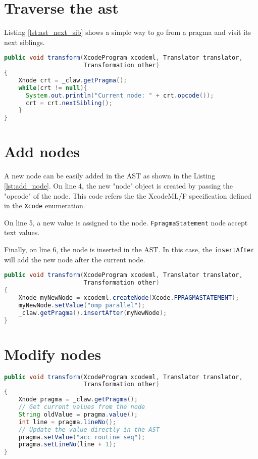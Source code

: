 \section{Traverse the \gls{ast}}
Listing \ref{lst:ast_next_sib} shows a simple way to go from a pragma and visit 
its next siblings.

\begin{lstlisting}[label=lst:ast_next_sib, language=Java, caption=XcodeML/F AST traverse]
public void transform(XcodeProgram xcodeml, Translator translator,
                      Transformation other)
{
    Xnode crt = _claw.getPragma();
    while(crt != null){
      System.out.println("Current node: " + crt.opcode());
      crt = crt.nextSibling();
    }
}
\end{lstlisting}

\section{Add nodes}
A new node can be easily added in the AST as shown in the Listing 
\ref{lst:add_node}. On line 4, the new "node" object is created by
passing the "opcode" of the node. This code refers the the XcodeML/F 
specification defined in the \lstinline!Xcode! enumeration.

On line 5, a new value is assigned to the node. \lstinline!FpragmaStatement! 
node accept text values.

Finally, on line 6, the node is inserted in the AST. In this case, 
the \lstinline!insertAfter! will add the new node after the current node.

\begin{lstlisting}[label=lst:add_node, language=Java, caption=XcodeML/F add node example]
public void transform(XcodeProgram xcodeml, Translator translator,
                      Transformation other)
{
    Xnode myNewNode = xcodeml.createNode(Xcode.FPRAGMASTATEMENT);
    myNewNode.setValue("omp parallel");
    _claw.getPragma().insertAfter(myNewNode);
}
\end{lstlisting}

\section{Modify nodes}

\begin{lstlisting}[label=lst:update_node, language=Java, caption=XcodeML/F update node example]
public void transform(XcodeProgram xcodeml, Translator translator,
                      Transformation other)
{
    Xnode pragma = _claw.getPragma();
    // Get current values from the node
    String oldValue = pragma.value();
    int line = pragma.lineNo();
    // Update the value directly in the AST
    pragma.setValue("acc routine seq");
    pragma.setLineNo(line + 1);
}
\end{lstlisting}


